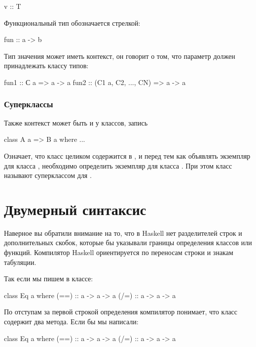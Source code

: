 \begin{code}
v :: T
\end{code}

Функциональный тип обозначается стрелкой: 


\begin{code}
fun :: a -> b
\end{code}

Тип значения может иметь контекст, он говорит о том, что параметр должен
принадлежать классу типов:


\begin{code}
fun1 :: С a                 => a -> a
fun2 :: (C1 a, C2, ..., CN) => a -> a
\end{code}

\subsubsection{Суперклассы}

Также контекст может быть и у классов, запись


\begin{code}
class A a => B a where
    ...
\end{code}

Означает, что класс  целиком содержится в , и перед тем как
объявлять экземпляр для класса , необходимо определить экземпляр
для класса . При этом класс  называют суперклассом для
.

\section{Двумерный синтаксис}

Наверное вы обратили внимание на то, что в Haskell нет разделителей
строк и дополнительных скобок, которые бы указывали границы определения
классов или функций. Компилятор Haskell ориентируется по переносам
строки и знакам табуляции.

Так если мы пишем в классе:


\begin{code}
class Eq a where
    (==) :: a -> a -> a
    (/=) :: a -> a -> a
\end{code}

По отступам за первой строкой определения компилятор понимает, что класс
содержит два метода. Если бы мы написали:


\begin{code}
class Eq a where
    (==) :: a -> a -> a
(/=) :: a -> a -> a
\end{code}


